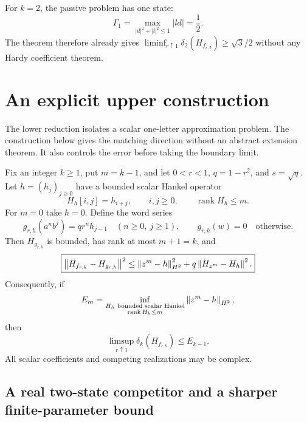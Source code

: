 

For $k=2$, the passive problem has one state:
\[
 \Gamma_1=\max_{|d|^2+|l|^2\le1}|ld|=\frac12.
\]
The theorem therefore already gives
$\liminf_{r\uparrow1}\delta_2(H_{f_{r,2}})\ge\sqrt3/2$ without any
Hardy coefficient theorem.

\section{An explicit upper construction}
\label{I:B:sec:lift}

The lower reduction isolates a scalar one-letter approximation problem.
The construction below gives the matching direction without an abstract
extension theorem. It also controls the error before taking the boundary
limit.

\begin{theorem}
\label{I:B:thm:upper-lift}
Fix an integer $k\ge1$, put $m=k-1$, and let $0<r<1$,
$q=1-r^2$, and $s=\sqrt q$. Let $h=(h_j)_{j\ge0}$ have a bounded
scalar Hankel operator
\[
 H_h[i,j]=h_{i+j},\qquad i,j\ge0,
 \qquad \operatorname{rank}H_h\le m.
\]
For $m=0$ take $h=0$. Define the word series
\begin{equation}
 g_{r,h}(a^n b^j)=q r^n h_{j-1}
 \quad(n\ge0,\ j\ge1),\qquad
 g_{r,h}(w)=0\quad\text{otherwise}.
 \label{I:B:eq:lift-series}
\end{equation}
Then $H_{g_{r,h}}$ is bounded, has rank at most $m+1=k$, and
\begin{equation}
 \boxed{\displaystyle
 \left\lVert H_{f_{r,k}}-H_{g_{r,h}}\right\rVert^2
 \le \left\lVert z^m-h\right\rVert_{H^2}^2
       +q\left\lVert H_{z^m}-H_h\right\rVert^2.}
 \label{I:B:eq:lift-finite-error}
\end{equation}
Consequently, if
\[
 E_m=\inf_{\substack{H_h\text{ bounded scalar Hankel}\\
                      \operatorname{rank}H_h\le m}}
        \left\lVert z^m-h\right\rVert_{H^2},
\]
then
\begin{equation}
 \limsup_{r\uparrow1}\delta_k(H_{f_{r,k}})\le E_{k-1}.
 \label{I:B:eq:lift-limsup}
\end{equation}
All scalar coefficients and competing realizations may be complex.
\end{theorem}



\subsection{A real two-state competitor and a sharper finite-parameter bound}
\label{I:B:subsec:lift-k2}

